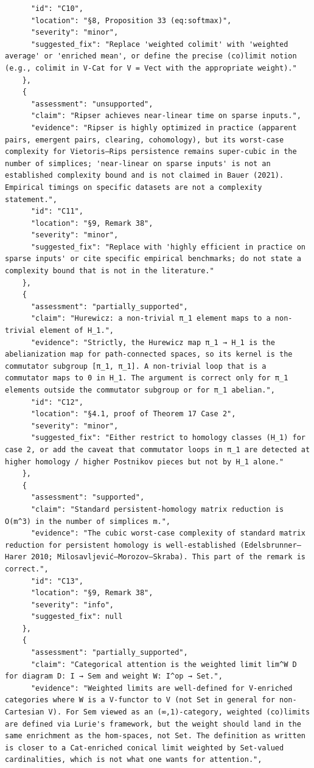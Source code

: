 \documentclass[11pt]{article}
\begin{document}
\begin{verbatim}
      "id": "C10",
      "location": "§8, Proposition 33 (eq:softmax)",
      "severity": "minor",
      "suggested_fix": "Replace 'weighted colimit' with 'weighted average' or 'enriched mean', or define the precise (co)limit notion (e.g., colimit in V-Cat for V = Vect with the appropriate weight)."
    },
    {
      "assessment": "unsupported",
      "claim": "Ripser achieves near-linear time on sparse inputs.",
      "evidence": "Ripser is highly optimized in practice (apparent pairs, emergent pairs, clearing, cohomology), but its worst-case complexity for Vietoris–Rips persistence remains super-cubic in the number of simplices; 'near-linear on sparse inputs' is not an established complexity bound and is not claimed in Bauer (2021). Empirical timings on specific datasets are not a complexity statement.",
      "id": "C11",
      "location": "§9, Remark 38",
      "severity": "minor",
      "suggested_fix": "Replace with 'highly efficient in practice on sparse inputs' or cite specific empirical benchmarks; do not state a complexity bound that is not in the literature."
    },
    {
      "assessment": "partially_supported",
      "claim": "Hurewicz: a non-trivial π_1 element maps to a non-trivial element of H_1.",
      "evidence": "Strictly, the Hurewicz map π_1 → H_1 is the abelianization map for path-connected spaces, so its kernel is the commutator subgroup [π_1, π_1]. A non-trivial loop that is a commutator maps to 0 in H_1. The argument is correct only for π_1 elements outside the commutator subgroup or for π_1 abelian.",
      "id": "C12",
      "location": "§4.1, proof of Theorem 17 Case 2",
      "severity": "minor",
      "suggested_fix": "Either restrict to homology classes (H_1) for case 2, or add the caveat that commutator loops in π_1 are detected at higher homology / higher Postnikov pieces but not by H_1 alone."
    },
    {
      "assessment": "supported",
      "claim": "Standard persistent-homology matrix reduction is O(m^3) in the number of simplices m.",
      "evidence": "The cubic worst-case complexity of standard matrix reduction for persistent homology is well-established (Edelsbrunner–Harer 2010; Milosavljević–Morozov–Skraba). This part of the remark is correct.",
      "id": "C13",
      "location": "§9, Remark 38",
      "severity": "info",
      "suggested_fix": null
    },
    {
      "assessment": "partially_supported",
      "claim": "Categorical attention is the weighted limit lim^W D for diagram D: I → Sem and weight W: I^op → Set.",
      "evidence": "Weighted limits are well-defined for V-enriched categories where W is a V-functor to V (not Set in general for non-Cartesian V). For Sem viewed as an (∞,1)-category, weighted (co)limits are defined via Lurie's framework, but the weight should land in the same enrichment as the hom-spaces, not Set. The definition as written is closer to a Cat-enriched conical limit weighted by Set-valued cardinalities, which is not what one wants for attention.",

\end{verbatim}
\end{document}
